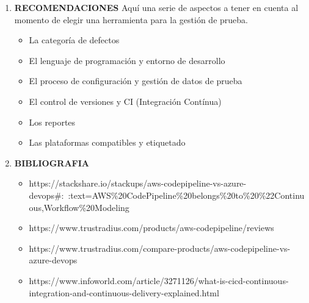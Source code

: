 \documentclass[12pt,a4paper,oneside]{book}
\begin{document}
\begin{enumerate}
		
		\item \textbf{RECOMENDACIONES}
			Aquí una serie de aspectos a tener en cuenta al momento de elegir una herramienta para la gestión de prueba.
			
			\begin{itemize}
				\item La categoría de defectos
				\item El lenguaje de programación y entorno de desarrollo
				\item El proceso de configuración y gestión de datos de prueba
				\item El control de versiones y CI (Integración Contínua)
				\item Los reportes
				\item Las plataformas compatibles y etiquetado
				
			\end{itemize}
			
		\item \textbf{BIBLIOGRAFIA}
			\begin{itemize}
				
			\item https://stackshare.io/stackups/aws-codepipeline-vs-azure-devops\#:~:text=AWS\%20CodePipeline\%20belongs\%20to\%20\%22Continuous,Workflow\%20Modeling
			
			\item https://www.trustradius.com/products/aws-codepipeline/reviews
			
			\item https://www.trustradius.com/compare-products/aws-codepipeline-vs-azure-devops
			
			\item https://www.infoworld.com/article/3271126/what-is-cicd-continuous-integration-and-continuous-delivery-explained.html
			 
			\end{itemize}
		
	\end{enumerate}
	
	
	
\end{document}
